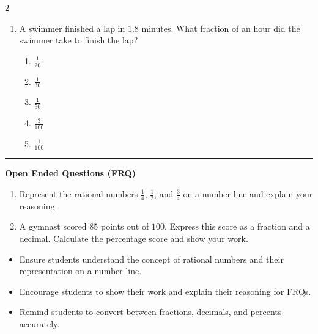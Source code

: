 \documentclass[10pt]{article}
\begin{document}
\begin{multicols}{2}
\begin{enumerate}[label=\textbf{Q\arabic*.}, leftmargin=*, itemsep=6pt, parsep=0pt]
  \item \small A swimmer finished a lap in $1.8$ minutes. What fraction of an hour did the swimmer take to finish the lap?
  \begin{enumerate}[label=(\Alph*), leftmargin=0.6cm, nosep, itemsep=2pt]
    \item $\frac{1}{20}$
    \item $\frac{1}{30}$
    \item $\frac{1}{50}$
    \item $\frac{3}{100}$
    \item $\frac{1}{100}$
  \end{enumerate}

\end{enumerate}
\end{multicols}

\vspace{-0.2cm}
\hrule
\vspace{0.2cm}
\textbf{\small Open Ended Questions (FRQ)}
\begin{enumerate}[label=\textbf{Q\arabic*.}, start=9, itemsep=5pt, topsep=0pt]

  \item \small Represent the rational numbers $\frac{1}{4}$, $\frac{1}{2}$, and $\frac{3}{4}$ on a number line and explain your reasoning. \vspace{2cm}

  \item \small A gymnast scored $85$ points out of $100$. Express this score as a fraction and a decimal. Calculate the percentage score and show your work. \vspace{2cm}

\end{enumerate}

\vfill

\begin{tcolorbox}[colback=blue!5, colframe=mainblue!50, title=\small \textbf{Chef's Tips}, fonttitle=\bfseries, bottom=1mm]
\begin{itemize}[noitemsep, topsep=2pt, leftmargin=0.5cm]
  \item \scriptsize Ensure students understand the concept of rational numbers and their representation on a number line.\item \scriptsize Encourage students to show their work and explain their reasoning for FRQs.\item \scriptsize Remind students to convert between fractions, decimals, and percents accurately.
\end{itemize}
\end{tcolorbox}
\end{document}
